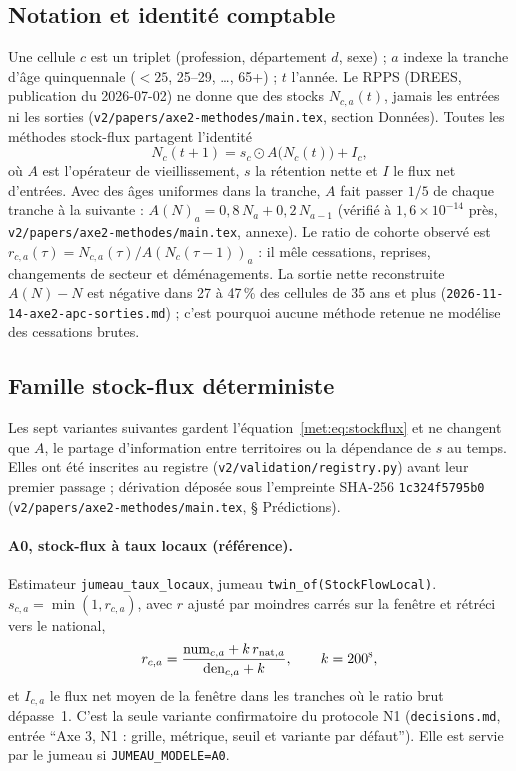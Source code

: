\subsection{Notation et identité comptable}
\label{met:notation}
Une cellule $c$ est un triplet (profession, département $d$, sexe) ; $a$ indexe la tranche d'âge
quinquennale ($<25$, 25--29, \dots, 65+) ; $t$ l'année. Le RPPS (DREES, publication du 2026-07-02) ne
donne que des stocks $N_{c,a}(t)$, jamais les entrées ni les sorties
(\texttt{v2/papers/axe2-methodes/main.tex}, section Données). Toutes les méthodes stock-flux partagent
l'identité
\begin{equation}
  N_c(t+1) = s_c \odot A\big(N_c(t)\big) + I_c,
  \label{met:eq:stockflux}
\end{equation}
où $A$ est l'opérateur de vieillissement, $s$ la rétention nette et $I$ le flux net d'entrées. Avec des
âges uniformes dans la tranche, $A$ fait passer $1/5$ de chaque tranche à la suivante :
$A(N)_a = 0{,}8\,N_a + 0{,}2\,N_{a-1}$ (vérifié à $1{,}6\times10^{-14}$\mesure{} près,
\texttt{v2/papers/axe2-methodes/main.tex}, annexe). Le ratio de cohorte observé est
$r_{c,a}(\tau) = N_{c,a}(\tau)/A(N_c(\tau-1))_a$ : il mêle cessations, reprises, changements de secteur et
déménagements. La sortie nette reconstruite $A(N)-N$ est négative dans 27 à 47\,\%\mesure{} des cellules
de 35 ans et plus (\texttt{2026-11-14-axe2-apc-sorties.md}) ; c'est pourquoi aucune méthode retenue ne
modélise des cessations brutes.

\subsection{Famille stock-flux déterministe}
\label{met:stockflux}
Les sept variantes suivantes gardent l'équation~\eqref{met:eq:stockflux} et ne changent que $A$, le partage
d'information entre territoires ou la dépendance de $s$ au temps. Elles ont été inscrites au registre
(\texttt{v2/validation/registry.py}) avant leur premier passage ; dérivation déposée sous l'empreinte
SHA-256 \texttt{1c324f5795b0} (\texttt{v2/papers/axe2-methodes/main.tex}, § Prédictions).

\paragraph{A0, stock-flux à taux locaux (référence).} Estimateur \texttt{jumeau\_taux\_locaux}, jumeau
\texttt{twin\_of(StockFlowLocal)}. $s_{c,a} = \min(1, r_{c,a})$, avec $r$ ajusté par moindres carrés sur la
fenêtre et rétréci vers le national,
\begin{equation}
  r_{c,a} = \frac{\text{num}_{c,a} + k\, r_{\text{nat},a}}{\text{den}_{c,a} + k}, \qquad k = 200\textsuperscript{\textsc{s}},
  \label{met:eq:shrink}
\end{equation}
et $I_{c,a}$ le flux net moyen de la fenêtre dans les tranches où le ratio brut dépasse~1. C'est la seule
variante confirmatoire du protocole N1 (\texttt{decisions.md}, entrée \enquote{Axe 3, N1 : grille,
métrique, seuil et variante par défaut}). Elle est servie par le jumeau si \texttt{JUMEAU\_MODELE=A0}.

